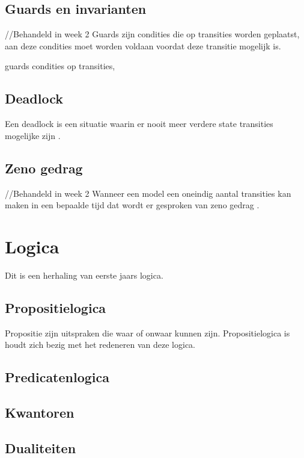 \documentclass{article}
\begin{document}
\subsection{Guards en invarianten}
//Behandeld in week 2 \newline 
Guards zijn condities die op transities worden geplaatst, aan deze condities moet worden voldaan voordat deze transitie mogelijk is.\cite{uppaalsmalltutorial}


guards condities op transities, 

\subsection{Deadlock}

Een deadlock is een situatie waarin er nooit meer verdere state transities mogelijke zijn \cite{uppaalintro}.

\subsection{Zeno gedrag}
//Behandeld in week 2 \newline
Wanneer een model een oneindig aantal transities kan maken in een bepaalde tijd dat wordt er gesproken van zeno gedrag \cite{uppaaltutorialmodelingpatterns} \cite{leine2011zeno}.
\section{Logica}

Dit is een herhaling van eerste jaars logica.

\subsection{Propositielogica}

Propositie zijn uitspraken die waar of onwaar kunnen zijn. Propositielogica is houdt zich bezig met het redeneren van deze logica.

\subsection{Predicatenlogica}

\subsection{Kwantoren}

\subsection{Dualiteiten}
\end{document}
